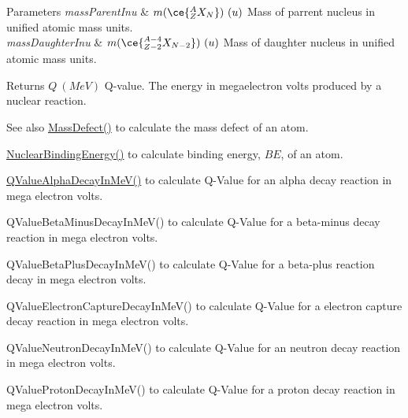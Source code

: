 \begin{DoxyParams}{Parameters}
{\em mass\+Parent\+Inu} & $m(\ce{ ^{A}_{Z}X_{N} })\ (u)$ Mass of parrent nucleus in unified atomic mass units. \\
\hline
{\em mass\+Daughter\+Inu} & $m(\ce{ ^{A-4}_{Z-2}X_{N-2} })\ (u)$ Mass of daughter nucleus in unified atomic mass units. \\
\hline
\end{DoxyParams}
\begin{DoxyReturn}{Returns}
$Q\ (MeV)$ Q-\/value. The energy in megaelectron volts produced by a nuclear reaction. 
\end{DoxyReturn}
\begin{DoxySeeAlso}{See also}
\mbox{\hyperlink{group___e_g_x_phys-_mass_defect_gae89f2dfa65992c0314adc2440b2f582a}{Mass\+Defect()}} to calculate the mass defect of an atom. 

\mbox{\hyperlink{group___e_g_x_phys-_nuclear_binding_energy_gab6832bf15ead7b4e867e759e0a2a078e}{Nuclear\+Binding\+Energy()}} to calculate binding energy, $BE$, of an atom. 

\mbox{\hyperlink{_q_value_8hpp_a4f9a38d3ad4bf93471a0affb493b6e72}{Q\+Value\+Alpha\+Decay\+In\+Me\+V()}} to calculate Q-\/\+Value for an alpha decay reaction in mega electron volts. 

Q\+Value\+Beta\+Minus\+Decay\+In\+Me\+V() to calculate Q-\/\+Value for a beta-\/minus decay reaction in mega electron volts. 

Q\+Value\+Beta\+Plus\+Decay\+In\+Me\+V() to calculate Q-\/\+Value for a beta-\/plus reaction decay in mega electron volts. 

Q\+Value\+Electron\+Capture\+Decay\+In\+Me\+V() to calculate Q-\/\+Value for a electron capture decay reaction in mega electron volts. 

Q\+Value\+Neutron\+Decay\+In\+Me\+V() to calculate Q-\/\+Value for an neutron decay reaction in mega electron volts. 

Q\+Value\+Proton\+Decay\+In\+Me\+V() to calculate Q-\/\+Value for a proton decay reaction in mega electron volts. 
\end{DoxySeeAlso}
